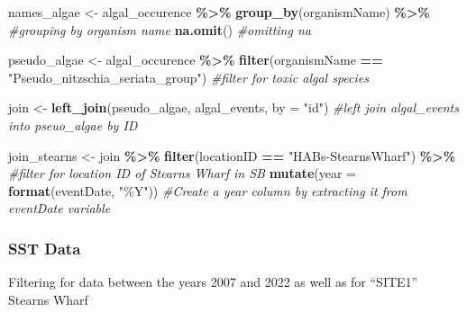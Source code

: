 \documentclass[
]{article}
\newenvironment{Shaded}{\begin{snugshade}}{\end{snugshade}}
\newcommand{\AttributeTok}[1]{\textcolor[rgb]{0.13,0.29,0.53}{#1}}
\newcommand{\CommentTok}[1]{\textcolor[rgb]{0.56,0.35,0.01}{\textit{#1}}}
\newcommand{\FunctionTok}[1]{\textcolor[rgb]{0.13,0.29,0.53}{\textbf{#1}}}
\newcommand{\NormalTok}[1]{#1}
\newcommand{\OtherTok}[1]{\textcolor[rgb]{0.56,0.35,0.01}{#1}}
\newcommand{\SpecialCharTok}[1]{\textcolor[rgb]{0.81,0.36,0.00}{\textbf{#1}}}
\newcommand{\StringTok}[1]{\textcolor[rgb]{0.31,0.60,0.02}{#1}}
\begin{document}
\begin{Shaded}
\begin{Highlighting}[]
\NormalTok{names\_algae }\OtherTok{\textless{}{-}}\NormalTok{ algal\_occurence }\SpecialCharTok{\%\textgreater{}\%}
  \FunctionTok{group\_by}\NormalTok{(organismName) }\SpecialCharTok{\%\textgreater{}\%} \CommentTok{\#grouping by organism name}
  \FunctionTok{na.omit}\NormalTok{() }\CommentTok{\#omitting na}

\NormalTok{pseudo\_algae }\OtherTok{\textless{}{-}}\NormalTok{ algal\_occurence }\SpecialCharTok{\%\textgreater{}\%}
  \FunctionTok{filter}\NormalTok{(organismName }\SpecialCharTok{==} \StringTok{"Pseudo\_nitzschia\_seriata\_group"}\NormalTok{) }\CommentTok{\#filter for toxic algal species}

\NormalTok{join }\OtherTok{\textless{}{-}} \FunctionTok{left\_join}\NormalTok{(pseudo\_algae, algal\_events, }\AttributeTok{by =} \StringTok{"id"}\NormalTok{) }\CommentTok{\#left join algal\_events into pseuo\_algae by ID}

\NormalTok{join\_stearns }\OtherTok{\textless{}{-}}\NormalTok{ join }\SpecialCharTok{\%\textgreater{}\%}
  \FunctionTok{filter}\NormalTok{(locationID }\SpecialCharTok{==} \StringTok{"HABs{-}StearnsWharf"}\NormalTok{) }\SpecialCharTok{\%\textgreater{}\%} \CommentTok{\#filter for location ID of Stearns Wharf in SB}
  \FunctionTok{mutate}\NormalTok{(}\AttributeTok{year =} \FunctionTok{format}\NormalTok{(eventDate, }\StringTok{"\%Y"}\NormalTok{)) }\CommentTok{\#Create a year column by extracting it from eventDate variable}
\end{Highlighting}
\end{Shaded}

\hypertarget{sst-data}{%
\subsubsection{SST Data}\label{sst-data}}

Filtering for data between the years 2007 and 2022 as well as for
``SITE1'' Stearns Wharf
\end{document}
